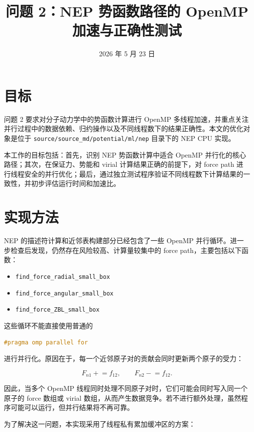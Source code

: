 \documentclass[11pt]{article}
\title{问题 2：NEP 势函数路径的 OpenMP 加速与正确性测试}
\author{}
\date{2026 年 5 月 23 日}
\begin{document}
\maketitle

\section{目标}

问题 2 要求对分子动力学中的势函数计算进行 OpenMP 多线程加速，并重点关注并行过程中的数据依赖、归约操作以及不同线程数下的结果正确性。本文的优化对象是位于
\texttt{source/source\_md/potential/ml/nep} 目录下的 NEP CPU 实现。

本工作的目标包括：首先，识别 NEP 势函数计算中适合 OpenMP 并行化的核心路径；其次，在保证力、势能和 virial 计算结果正确的前提下，对 force path 进行线程安全的并行优化；最后，通过独立测试程序验证不同线程数下计算结果的一致性，并初步评估运行时间和加速比。

\section{实现方法}

NEP 的描述符计算和近邻表构建部分已经包含了一些 OpenMP 并行循环。进一步检查后发现，仍然存在风险较高、计算量较集中的 force path，主要包括以下函数：

\begin{itemize}
  \item \texttt{find\_force\_radial\_small\_box}
  \item \texttt{find\_force\_angular\_small\_box}
  \item \texttt{find\_force\_ZBL\_small\_box}
\end{itemize}

这些循环不能直接使用普通的

\begin{lstlisting}[language=C++]
#pragma omp parallel for
\end{lstlisting}

进行并行化。原因在于，每一个近邻原子对的贡献会同时更新两个原子的受力：

\[
  F_{n1} \mathrel{+}= f_{12}, \qquad F_{n2} \mathrel{-}= f_{12}.
\]

因此，当多个 OpenMP 线程同时处理不同原子对时，它们可能会同时写入同一个原子的 force 数组或 virial 数组，从而产生数据竞争。若不进行额外处理，虽然程序可能可以运行，但并行结果将不再可靠。

为了解决这一问题，本实现采用了线程私有累加缓冲区的方案：
\end{document}

